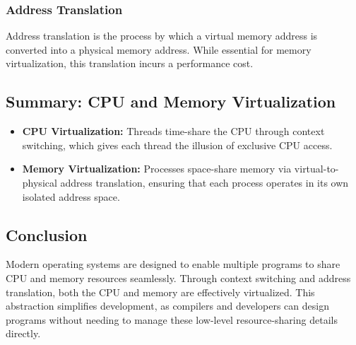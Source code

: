 \subsubsection{Address Translation}
\begin{definition}
Address translation is the process by which a virtual memory address is converted into a physical memory address. While essential for memory virtualization, this translation incurs a performance cost.
\end{definition}

\subsection{Summary: CPU and Memory Virtualization}
\begin{itemize}
    \item \textbf{CPU Virtualization:} Threads time-share the CPU through context switching, which gives each thread the illusion of exclusive CPU access.
    \item \textbf{Memory Virtualization:} Processes space-share memory via virtual-to-physical address translation, ensuring that each process operates in its own isolated address space.
\end{itemize}

\subsection{Conclusion}
Modern operating systems are designed to enable multiple programs to share CPU and memory resources seamlessly. Through context switching and address translation, both the CPU and memory are effectively virtualized. This abstraction simplifies development, as compilers and developers can design programs without needing to manage these low-level resource-sharing details directly.
